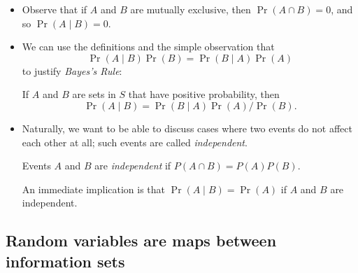 \begin{itemize}[leftmargin=0pt]
\item Observe that if $A$ and $B$ are mutually exclusive, then $\Pr(A
  \cap B) = 0$, and so $\Pr(A \mid B) = 0$.

\item We can use the definitions and the simple observation that
  \begin{equation*}
    \Pr(A \mid B) \Pr(B) = \Pr(B \mid A) \Pr(A)
  \end{equation*}
  to justify \emph{Bayes's Rule}:
  \begin{thm}
    If $A$ and $B$ are sets in $S$ that have positive probability, then
    \begin{equation*}
      \Pr(A \mid B) = \Pr(B \mid A) \Pr(A) / \Pr(B).
    \end{equation*}
  \end{thm}

\item Naturally, we want to be able to discuss cases where two events
  do not affect each other at all; such events are called
  \emph{independent}.

  \begin{defn}
    Events $A$ and $B$ are \emph{independent} if $P(A \cap B) = P(A)
    P(B)$.
  \end{defn}

  An immediate implication is that $\Pr(A \mid B) = \Pr(A)$ if $A$ and
  $B$ are independent.

\end{itemize}

\subsection{Random variables are maps between information sets}

